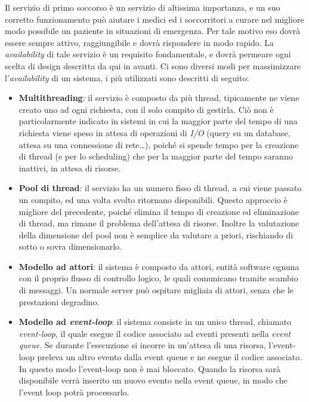 \documentclass[a4paper,12pt]{report}
\begin{document}
Il servizio di primo soccorso è un servizio di altissima importanza, e un suo corretto funzionamento può aiutare i medici ed i soccorritori a curare nel migliore modo possibile un paziente in situazioni di emergenza. Per tale motivo eso dovrà essere sempre attivo, raggiungibile e dovrà rispondere in modo rapido. La \emph{availability} di tale servizio è un requisito fondamentale, e dovrà permeare ogni scelta di design descritta da qui in avanti. Ci sono diversi modi per massimizzare l'\emph{availability} di un sistema, i più utilizzati sono descritti di seguito: 
\begin{itemize}
	\item \textbf{Multithreading}: il servizio è composto da più thread, tipicamente ne viene creato uno ad ogni richiesta, con il solo compito di gestirla. Ciò non è particolarmente indicato in sistemi in cui la maggior parte del tempo di una richiesta viene speso in attesa di operazioni di \emph{I/O} (query su un database, attesa su una connessione di rete\dots), poiché si spende tempo per la creazione di thread (e per lo scheduling) che per la maggior parte del tempo saranno inattivi, in attesa di risorse.
	\item \textbf{Pool di thread}: il servizio ha un numero fisso di thread, a cui viene passato un compito, ed una volta svolto ritornano disponibili. Questo approccio è migliore del precedente, poiché elimina il tempo di creazione ed eliminazione di thread, ma rimane il problema dell'attesa di risorse. Inoltre la valutazione della dimensione del pool non è semplice da valutare a priori, rischiando di sotto o sovra dimensionarlo.
	\item \textbf{Modello ad attori}: il sistema è composto da attori, entità software ognuna con il proprio flusso di controllo logico, le quali comunicano tramite scambio di messaggi. Un normale server può ospitare migliaia di attori, senza che le prestazioni degradino. 
	\item \textbf{Modello ad \emph{event-loop}}: il sistema consiste in un unico thread, chiamato \emph{event-loop}, il quale esegue il codice associato ad eventi presenti nella \emph{event queue}. Se durante l'esecuzione si incorre in un'attesa di una risorsa, l'event-loop preleva un altro evento dalla event queue e ne esegue il codice associato. In questo modo l'event-loop non è mai bloccato. Quando la risorsa sarà disponibile verrà inserito un nuovo evento nella event queue, in modo che l'event loop potrà processarlo. 
\end{itemize}
\end{document}
